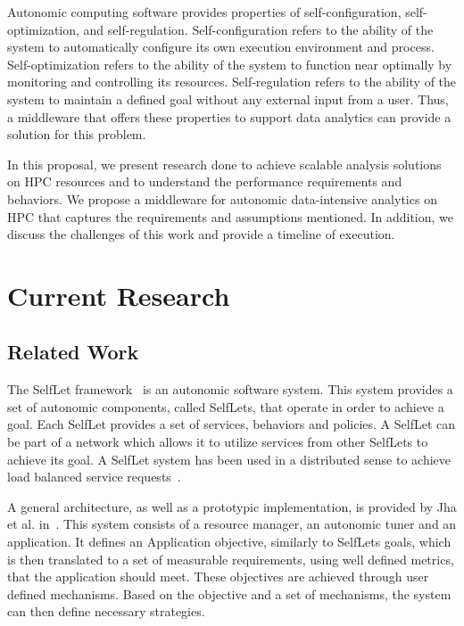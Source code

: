 Autonomic computing software provides properties of self-configuration, self-optimization, 
and self-regulation. Self-configuration refers to the ability of the system to automatically 
configure its own execution environment and process. Self-optimization refers to the ability of 
the system to function near optimally by monitoring and controlling its resources. Self-regulation 
refers to the ability of the system to maintain a defined goal without any external input from a 
user. Thus, a middleware that offers these properties to support data analytics can provide a solution 
for this problem.

In this proposal, we present research done to achieve scalable analysis solutions on HPC resources 
and to understand the performance requirements and behaviors. We propose a middleware for autonomic 
data-intensive analytics on HPC that captures the requirements and assumptions mentioned. In addition, 
we discuss the challenges of this work and provide a timeline of execution.

\section{Current Research}

\subsection{Related Work}

The SelfLet framework~\cite{bindelli2008building} is an autonomic software system. This system provides a set of 
autonomic components, called SelfLets, that operate in order to achieve a goal. Each SelfLet provides a 
set of services, behaviors and policies. A SelfLet can be part of a network which allows it to utilize 
services from other SelfLets to achieve its goal. A SelfLet system has been used in a distributed sense 
to achieve load balanced service requests~\cite{calcavecchia2010emergence}.

A general architecture, as well as a prototypic implementation, is provided by Jha et al. 
in~\cite{jha2009self}. This system consists of a resource manager, an autonomic tuner and an 
application. It defines an Application objective, similarly to SelfLets goals, which is then translated 
to a set of measurable requirements, using well defined metrics, that the application should meet. 
These objectives are achieved through user defined mechanisms. Based on the objective and a set of 
mechanisms, the system can then define necessary strategies.

